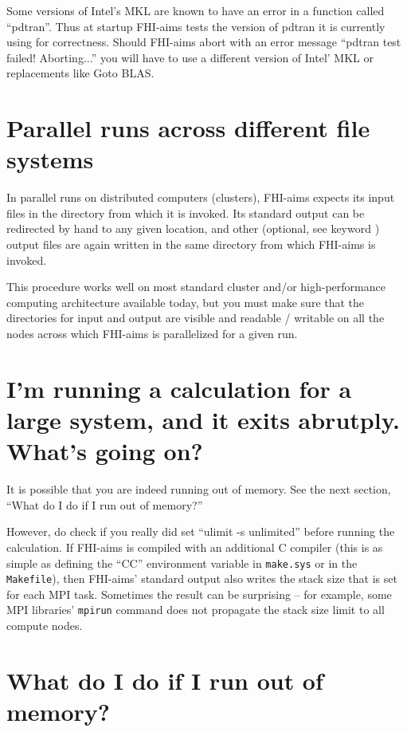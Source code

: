 Some versions of Intel's MKL are known to have an error in a function
called  ``pdtran''. Thus at startup FHI-aims tests the version of
pdtran it is currently using for correctness. Should FHI-aims abort
with an error message ``pdtran test failed! Aborting...'' you will
have to use a different version of Intel' MKL or replacements like
Goto BLAS.

\section{Parallel runs across different file systems}

In parallel runs on distributed computers (clusters), FHI-aims expects
its input files in the directory from which it is invoked. Its
standard output can be redirected by hand to any given location, and
other (optional, see keyword ) output files are
again written in the same directory from which FHI-aims is invoked.

This procedure works well on most standard cluster and/or
high-performance computing architecture available today, but you must
make sure that the directories for input and output are visible and
readable / writable on all the nodes across which FHI-aims is
parallelized for a given run.

\section{I'm running a calculation for a large system, and it exits abrutply.
What's going on?}

It is possible that you are indeed running out of memory. See the next section,
``What do I do if I run out of memory?''

However, do check if you really did set ``ulimit -s unlimited'' before
running the calculation. If FHI-aims is compiled with an additional C compiler
(this is as simple as defining the ``CC'' environment variable in
\texttt{make.sys} or in the \texttt{Makefile}), then FHI-aims' standard output
also writes the stack size that is set for each MPI task. Sometimes the result
can be surprising -- for example, some MPI libraries' \texttt{mpirun} command
does not propagate the stack size limit to all compute nodes.

\section{What do I do if I run out of memory?}

